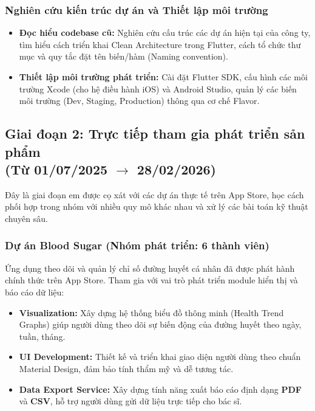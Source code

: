 \documentclass[12pt, a4paper]{article}
\begin{document}
\subsubsection{Nghiên cứu kiến trúc dự án và Thiết lập môi trường}
\begin{itemize}
    \item \textbf{Đọc hiểu codebase cũ:} Nghiên cứu cấu trúc các dự án hiện tại của công ty, tìm hiểu cách triển khai Clean Architecture trong Flutter, cách tổ chức thư mục và quy tắc đặt tên biến/hàm (Naming convention).
    \item \textbf{Thiết lập môi trường phát triển:} Cài đặt Flutter SDK, cấu hình các môi trường Xcode (cho hệ điều hành iOS) và Android Studio, quản lý các biến môi trường (Dev, Staging, Production) thông qua cơ chế Flavor.
\end{itemize}

\subsection[Giai đoạn 2: Trực tiếp tham gia phát triển sản phẩm (Từ 01/07/2025 đến 28/02/2026)]{Giai đoạn 2: Trực tiếp tham gia phát triển sản phẩm \\(Từ 01/07/2025 $\rightarrow$ 28/02/2026)}
Đây là giai đoạn em được cọ xát với các dự án thực tế trên App Store, học cách phối hợp trong nhóm với nhiều quy mô khác nhau và xử lý các bài toán kỹ thuật chuyên sâu.
\subsubsection{Dự án Blood Sugar (Nhóm phát triển: 6 thành viên)}
Ứng dụng theo dõi và quản lý chỉ số đường huyết cá nhân đã được phát hành chính thức trên App Store. Tham gia với vai trò phát triển module hiển thị và báo cáo dữ liệu:
\begin{itemize}
    \item \textbf{Visualization:} Xây dựng hệ thống biểu đồ thông minh (Health Trend Graphs) giúp người dùng theo dõi sự biến động của đường huyết theo ngày, tuần, tháng.
    \item \textbf{UI Development:} Thiết kế và triển khai giao diện người dùng theo chuẩn Material Design, đảm bảo tính thẩm mỹ và dễ tương tác.
    \item \textbf{Data Export Service:} Xây dựng tính năng xuất báo cáo định dạng \textbf{PDF} và \textbf{CSV}, hỗ trợ người dùng gửi dữ liệu trực tiếp cho bác sĩ.
\end{itemize}
\end{document}
